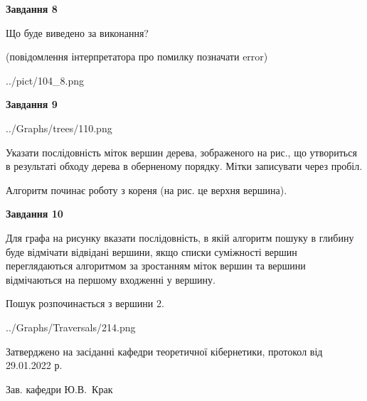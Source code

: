 \documentclass[12pt, ukrainian]{article}
\begin{document}
{\begin {large}
{\begin {center}\textbf{Завдання 8}\end {center}}\par
Що буде виведено за виконання?\par
 (повідомлення інтерпретатора про помилку позначати error)\par
\begin{center}
	{../pict/104_8.png}
\end{center}
\newpage

{\begin {center}\textbf{Завдання 9}\end {center}}\par

\begin{center}
	{../Graphs/trees/110.png}
\end{center}
Указати послідовність міток вершин дерева, зображеного на рис., що утвориться в результаті обходу дерева в оберненому порядку. Мітки записувати через пробіл.\par Алгоритм починає роботу з кореня (на рис. це верхня вершина).\par
\newpage

{\begin {center}\textbf{Завдання 10}\end {center}}\par
Для графа на рисунку вказати послідовність, в якій алгоритм пошуку в глибину буде відмічати відвідані вершини, якщо списки суміжності вершин переглядаються алгоритмом за зростанням міток вершин та вершини відмічаються на першому вход\-женні у вершину.\par
Пошук розпочинається з вершини 2.\par

\begin{center}
	{../Graphs/Traversals/214.png}
\end{center}\par
\newpage


\end {large}
}
{\smallskip \begin {small} Затверджено на засіданні кафедри теоретичної кібернетики, протокол  від   29.01.2022 р.\par\smallskip\smallskip
{\parbox {6.5 cm}{Зав. кафедри \dotfill Ю.В.~Крак}} \end{small}}
\end{document}
